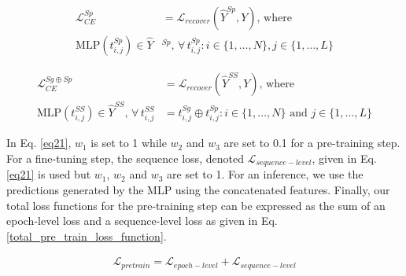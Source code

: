 \vspace{-15pt}
\begin{align}
\label{eq20-2}
\mathcal{L}^{Sp}_{CE} &= \mathcal{L}_{recover}(\hat{Y}^{Sp}, Y) \text{, where } 
\\ \nonumber
\text{MLP}(t^{Sp}_{i, j}) \in \hat{Y}&^{Sp}, \,\forall\, t^{Sp}_{i, j} : i \in \{1, \ldots, N\}, j \in \{1, \ldots, L\}
\end{align}

\vspace{-15pt}
\begin{align}
\label{eq20-3}
\mathcal{L}^{Sg \oplus Sp}_{CE} &= \mathcal{L}_{recover}(\hat{Y}^{SS}, Y) \text{, where } 
\\ \nonumber
\text{MLP}(t^{SS}_{i, j}) \in \hat{Y}^{SS}, \,\forall\, t^{SS}_{i, j}&= t^{Sg}_{i, j} \oplus t^{Sp}_{i, j} \nonumber : i \in \{1, \ldots, N\} \text{ and } j \in \{1, \ldots, L\}
\end{align}
\vspace{-5pt}

In Eq. \ref{eq21}, $w_{1}$ is set to 1 while $w_{2}$ and $w_{3}$ are set to 0.1 for a pre-training step.
For a fine-tuning step, the sequence loss, denoted $\mathcal{L}_{sequence-level}$, given in Eq. \ref{eq21} is used but $w_{1}$, $w_{2}$ and $w_{3}$ are set to 1.
For an inference, we use the predictions generated by the MLP using the concatenated features.
%
Finally, our total loss functions for the pre-training step can be expressed as the sum of an epoch-level loss and a sequence-level loss as given in Eq. \ref{total_pre_train_loss_function}.

\vspace{-10pt}
\begin{gather}
\label{total_pre_train_loss_function}
\mathcal{L}_{pretrain} = \mathcal{L}_{epoch-level} + \mathcal{L}_{sequence-level}
\end{gather}